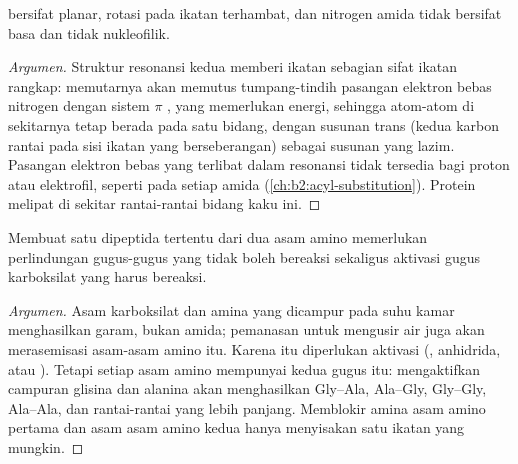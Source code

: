 \begin{proposition}\label{prop:b2:biomolecules:planar}
 bersifat planar, rotasi pada ikatan  terhambat, dan
nitrogen amida tidak bersifat basa dan tidak nukleofilik.
\end{proposition}

\begin{proof}[Argumen]
Struktur resonansi kedua memberi ikatan  sebagian sifat ikatan
rangkap: memutarnya akan memutus tumpang-tindih pasangan elektron bebas
nitrogen dengan sistem $\pi$ , yang memerlukan energi, sehingga
atom-atom di sekitarnya tetap berada pada satu bidang, dengan susunan trans
(kedua karbon rantai pada sisi ikatan  yang berseberangan) sebagai
susunan yang lazim. Pasangan elektron bebas yang terlibat dalam resonansi
tidak tersedia bagi proton atau elektrofil, seperti pada setiap amida
(\cref{ch:b2:acyl-substitution}). Protein melipat di sekitar rantai-rantai
bidang kaku ini.
\end{proof}

\begin{proposition}\label{prop:b2:biomolecules:coupling}
Membuat satu dipeptida tertentu dari dua asam amino memerlukan perlindungan
gugus-gugus yang tidak boleh bereaksi sekaligus aktivasi gugus karboksilat
yang harus bereaksi.
\end{proposition}

\begin{proof}[Argumen]
Asam karboksilat dan amina yang dicampur pada suhu kamar menghasilkan garam,
bukan amida; pemanasan untuk mengusir air juga akan merasemisasi asam-asam
amino itu. Karena itu diperlukan aktivasi (, anhidrida, atau
). Tetapi setiap asam amino mempunyai kedua gugus itu:
mengaktifkan campuran glisina dan alanina akan menghasilkan Gly--Ala,
Ala--Gly, Gly--Gly, Ala--Ala, dan rantai-rantai yang lebih panjang.
Memblokir amina asam amino pertama dan asam asam amino kedua hanya
menyisakan satu ikatan yang mungkin.
\end{proof}

